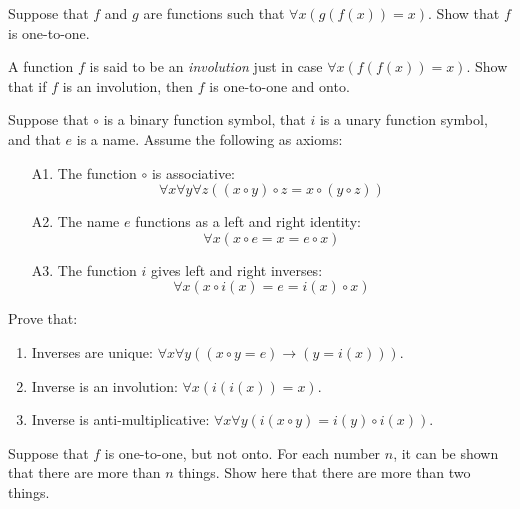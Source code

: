 \begin{exercise} Suppose that $f$ and $g$ are functions such that
   \mbox{$\forall x(g(f(x))=x)$}.  Show that $f$ is
   one-to-one. \end{exercise}

 \begin{exercise} A function $f$ is said to be an {\it involution}
   just in case \mbox{$\forall x(f(f(x))=x)$}.  Show that if $f$ is an
   involution, then $f$ is one-to-one and onto. \end{exercise}

 \begin{exercises} Suppose that $\circ$ is a binary function symbol, that $i$ is a
   unary function symbol, and that $e$
   is a name.  Assume the following as axioms:
   \begin{enumerate}
   \item[A1.] The function $\circ$ is associative:
     \[ \forall x\forall y\forall z((x\circ y)\circ z=x\circ (y\circ
       z))  \]
   \item[A2.] The name $e$ functions as a left and right identity:
     \[ \forall x(x\circ e=x=e\circ x) \]
   \item[A3.] The function $i$ gives left and right inverses:
     \[ \forall x(x\circ i(x)=e=i(x)\circ x) \] \end{enumerate}
   Prove that:
   \begin{enumerate}
   \item Inverses are unique: $\forall x\forall y((x\circ y=e)\to
     (y=i(x)))$.
   \item Inverse is an involution: $\forall x(i(i(x))=x)$.   
   \item Inverse is anti-multiplicative: $\forall x\forall y(i(x\circ y)=i(y)\circ
     i(x))$.
 \end{enumerate}
\end{exercises}

\begin{exercise} Suppose that $f$ is one-to-one, but not onto.  For
  each number $n$, it can be shown that there are more than $n$
  things.  Show here that there are more than two
  things.  \end{exercise}


